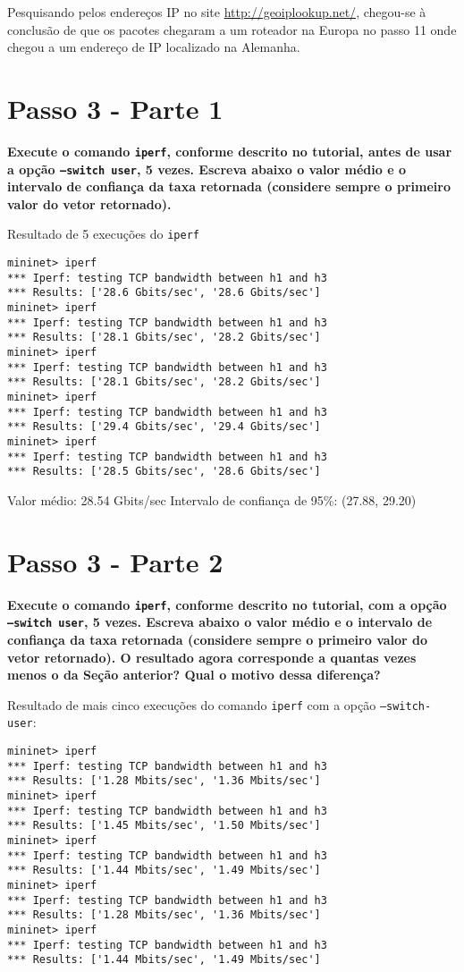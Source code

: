 \documentclass[12pt,letterpaper]{article}
\begin{document}
Pesquisando pelos endereços IP no site \url{http://geoiplookup.net/}, chegou-se à conclusão de que
os pacotes chegaram a um roteador na Europa no passo 11 onde chegou a um endereço de IP localizado
na Alemanha.

\section{Passo 3 - Parte 1}

\textbf{Execute o comando \texttt{iperf}, conforme descrito no
tutorial, antes de usar a opção \texttt{--switch user}, 5 vezes.
Escreva abaixo o valor médio e o intervalo de confiança da taxa
retornada (considere sempre o primeiro valor do vetor retornado).}

Resultado de 5 execuções do \texttt{iperf}

\begin{verbatim}
mininet> iperf
*** Iperf: testing TCP bandwidth between h1 and h3
*** Results: ['28.6 Gbits/sec', '28.6 Gbits/sec']
mininet> iperf
*** Iperf: testing TCP bandwidth between h1 and h3
*** Results: ['28.1 Gbits/sec', '28.2 Gbits/sec']
mininet> iperf
*** Iperf: testing TCP bandwidth between h1 and h3
*** Results: ['28.1 Gbits/sec', '28.2 Gbits/sec']
mininet> iperf
*** Iperf: testing TCP bandwidth between h1 and h3
*** Results: ['29.4 Gbits/sec', '29.4 Gbits/sec']
mininet> iperf
*** Iperf: testing TCP bandwidth between h1 and h3
*** Results: ['28.5 Gbits/sec', '28.6 Gbits/sec']
\end{verbatim}

Valor médio: 28.54 Gbits/sec
Intervalo de confiança de 95\%: (27.88, 29.20)

\section{Passo 3 - Parte 2}

\textbf{Execute o comando \texttt{iperf}, conforme descrito no
tutorial, com a opção \texttt{--switch user}, 5 vezes. Escreva abaixo
o valor médio e o intervalo de confiança da taxa retornada (considere
sempre o primeiro valor do vetor retornado). O resultado agora
corresponde a quantas vezes menos o da Seção anterior? Qual o motivo
dessa diferença?}

Resultado de mais cinco execuções do comando \texttt{iperf} com a opção
\texttt{--switch-user}:

\begin{verbatim}
mininet> iperf
*** Iperf: testing TCP bandwidth between h1 and h3
*** Results: ['1.28 Mbits/sec', '1.36 Mbits/sec']
mininet> iperf
*** Iperf: testing TCP bandwidth between h1 and h3
*** Results: ['1.45 Mbits/sec', '1.50 Mbits/sec']
mininet> iperf
*** Iperf: testing TCP bandwidth between h1 and h3
*** Results: ['1.44 Mbits/sec', '1.49 Mbits/sec']
mininet> iperf
*** Iperf: testing TCP bandwidth between h1 and h3
*** Results: ['1.28 Mbits/sec', '1.36 Mbits/sec']
mininet> iperf
*** Iperf: testing TCP bandwidth between h1 and h3
*** Results: ['1.44 Mbits/sec', '1.49 Mbits/sec']
\end{verbatim}
\end{document}

